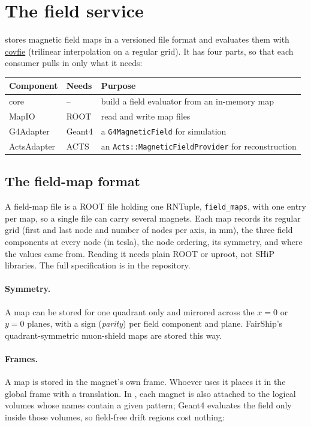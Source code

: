 \section{The field service}
\label{sec:fieldservice}

 stores magnetic field maps in a versioned file format and
evaluates them with \href{https://github.com/acts-project/covfie}{covfie}
(trilinear interpolation on a regular grid). It has four parts, so that each
consumer pulls in only what it needs:

\begin{center}
\begin{tabularx}{\linewidth}{l l L}
\toprule
Component & Needs & Purpose \\
\midrule
core       & --        & build a field evaluator from an in-memory map \\
MapIO      & ROOT      & read and write map files \\
G4Adapter  & Geant4    & a \texttt{G4MagneticField} for simulation \\
ActsAdapter& ACTS      & an \texttt{Acts::MagneticFieldProvider} for reconstruction \\
\bottomrule
\end{tabularx}
\end{center}

\subsection{The field-map format}

A field-map file is a ROOT file holding one RNTuple, \texttt{field\_maps},
with one entry per map, so a single file can carry several magnets. Each map
records its regular grid (first and last node and number of nodes per axis,
in mm), the three field components at every node (in tesla), the node
ordering, its symmetry, and where the values came from. Reading it needs
plain ROOT or uproot, not SHiP libraries. The full specification is
 in the repository.

\paragraph{Symmetry.} A map can be stored for one quadrant only and mirrored
across the $x=0$ or $y=0$ planes, with a sign (\emph{parity}) per field
component and plane. FairShip's quadrant-symmetric muon-shield maps are stored
this way.

\paragraph{Frames.} A map is stored in the magnet's own frame. Whoever uses it
places it in the global frame with a translation. In , each magnet is
also attached to the logical volumes whose names contain a given pattern;
Geant4 evaluates the field only inside those volumes, so field-free drift
regions cost nothing:

